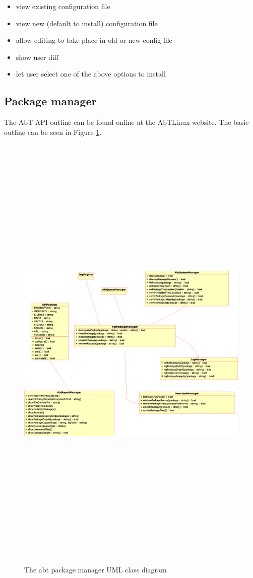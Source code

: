 \begin{itemize}
  \item view existing configuration file
  \item view new (default to install) configuration file
  \item allow editing to take place in old or new config file
  \item show user diff
  \item let user select one of the above options to install
\end{itemize}


\subsection{Package manager}
The AbT API outline can be found online at the AbTLinux website. The basic outline can be seen in Figure \ref{fig:abtapi}.

\begin{figure}
	\centering
	\includegraphics[width=16cm,height=22cm]{design/umlDesign.eps}
	\caption{The abt package manager UML class diagram}
	\label{fig:abtapi}
\end{figure}


